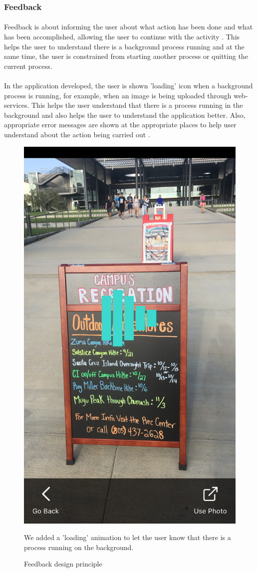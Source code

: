 \documentclass[12pt]{article}
\begin{document}
        \subsubsection{Feedback}
       \paragraph{}Feedback is about informing the user about what action has been done and what has been accomplished, allowing the user to continue with the activity \cite{norman}. This helps the user to understand there is a background process running and at the same time, the user is constrained from starting another process or quitting the current process. 
       
       \paragraph{}In the application developed, the user is shown 'loading' icon when a background process is running, for example, when an image is being uploaded through web-services. This helps the user understand that there is a process running in the background and also helps the user to understand the application better. Also, appropriate error messages are shown at the appropriate places to help user understand about the action being carried out \cite{norman}.
       
       \begin{figure}[H]
	\centering
	\includegraphics[width=0.5\linewidth]{media/loading1.PNG}
	\caption{Feedback design principle}{We added a 'loading' animation to let the user know that there is a process running on the background.}
	\label{fig:feedback}
\end{figure} 
\end{document}
